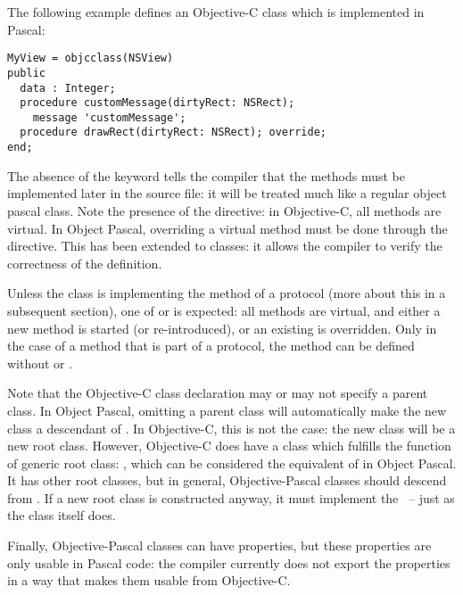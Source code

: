 The following example defines an Objective-C class which is implemented in
Pascal:
\begin{verbatim}
MyView = objcclass(NSView)
public
  data : Integer;
  procedure customMessage(dirtyRect: NSRect);
    message 'customMessage';
  procedure drawRect(dirtyRect: NSRect); override;
end;
\end{verbatim}
The absence of the  keyword tells the compiler that the
methods must be implemented later in the source file: it will be treated
much like a regular object pascal class. Note the presence of the
 directive: in Objective-C, all methods are virtual. In Object
Pascal, overriding a virtual method must be done through the 
directive. This has been extended to  classes: it allows
the compiler to verify the correctness of the definition.

Unless the class is implementing the method of a protocol (more about this
in a subsequent section), one of  or  is
expected: all methods are virtual, and either a new method is started (or
re-introduced), or an existing is overridden. Only in the case of a method
that is part of a protocol, the method can be defined without 
or .


Note that the Objective-C class declaration may or may not specify a parent class.
In Object Pascal, omitting a parent class will automatically make the
new class a descendant of . In Objective-C, this is not the
case: the new class will be a new root class. However, Objective-C does
have a class which fulfills the function of generic root class:
, which can be considered the equivalent of 
in Object Pascal. It has other root classes, but in general,
Objective-Pascal classes should descend from . If a new
root class is constructed anyway, it must implement the
~-- just as the  class itself does.

Finally, Objective-Pascal classes can have properties, but these properties
are only usable in Pascal code: the compiler currently does not export the
properties in a way that makes them usable from Objective-C.

